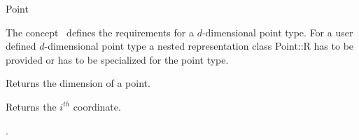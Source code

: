 

\begin{ccRefConcept}{Point}


\ccDefinition
  
The concept \ccClassTemplateName\ defines the requirements for a 
$d$-dimensional point type.
For a user defined $d$-dimensional point type a nested representation class
Point::R has to be provided or  has to be
specialized for the point type. 


\ccOperations

{Returns the dimension of a point.}

{Returns the $i^{th}$ coordinate.}

\ccHasModels

.

\end{ccRefConcept}


